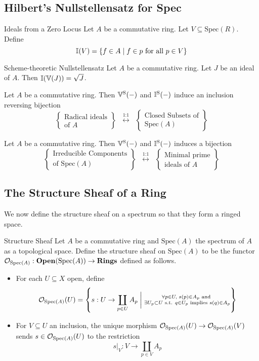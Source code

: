 \documentclass[a4paper]{article}
\begin{document}
\subsection{Hilbert's Nullstellensatz for Spec}
\begin{defn}{Ideals from a Zero Locus}{} Let $A$ be a commutative ring. Let $V\subseteq\text{Spec}(R)$. Define $$\mathbb{I}(V)=\{f\in A\;|\;f\in p\text{ for all }p\in V\}$$
\end{defn}

\begin{thm}{Scheme-theoretic Nullstellensatz}{} Let $A$ be a commutative ring. Let $J$ be an ideal of $A$. Then $\mathbb{I}(\mathbb{V}(J))=\sqrt{J}$. 
\end{thm}

\begin{prp}{}{} Let $A$ be a commutative ring. Then $\mathbb{V}^\text{S}(-)$ and $\mathbb{I}^\text{S}(-)$ induce an inclusion reversing bijection $$\left\{\substack{\text{Radical ideals}\\\text{of }A}\right\}\;\;\overset{\text{1:1}}{\longleftrightarrow}\;\;\left\{\substack{\text{Closed Subsets of}\\\text{Spec}(A)}\right\}$$
\end{prp}

\begin{prp}{}{} Let $A$ be a commutative ring. Then $\mathbb{V}^\text{S}(-)$ and $\mathbb{I}^\text{S}(-)$ induces a bijection $$\left\{\substack{\text{Irreducible Components}\\ \text{of Spec}(A)}\right\}\;\;\overset{\text{1:1}}{\longleftrightarrow}\;\;\left\{\substack{\text{Minimal prime}\\\text{ideals of }A}\right\}$$
\end{prp}

\subsection{The Structure Sheaf of a Ring}
We now define the structure sheaf on a spectrum so that they form a ringed space. 

\begin{defn}{Structure Sheaf}{} Let $A$ be a commutative ring and $\text{Spec}(A)$ the spectrum of $A$ as a topological space. Define the structure sheaf on $\text{Spec}(A)$ to be the functor $\mathcal{O}_{\text{Spec}(A)}:\bold{Open}(\text{Spec}(A))\to\bold{Rings}$ defined as follows. 
\begin{itemize}
\item For each $U\subseteq X$ open, define $$\mathcal{O}_{\text{Spec}(A)}(U)=\left\{s:U\to\coprod_{p\in U}A_p\;\bigg{|}\;\substack{\forall p\in U,\;s(p)\in A_p\text{ and }\\\exists U_p\subset U\text{ s.t. }q\in U_p\text{ implies }s(q)\in A_p}\right\}$$
\item For $V\subseteq U$ an inclusion, the unique morphism $\mathcal{O}_{\text{Spec}(A)}(U)\to\mathcal{O}_{\text{Spec}(A)}(V)$ sends $s\in\mathcal{O}_{\text{Spec}(A)}(U)$ to the restriction $$s|_V:V\to\coprod_{p\in V}A_p$$
\end{itemize}
\end{defn}
\end{document}
